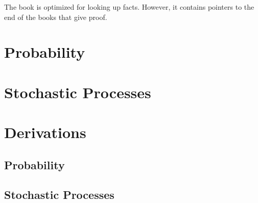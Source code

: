 \documentclass[letterpaper,12pt]{article}
\begin{document}
\raggedright

\setlength{\columnseprule}{0.5pt}
\setcounter{tocdepth}{4}
\tableofcontents

The book is optimized for looking up facts. However, it contains pointers to the
end of the books that give proof.

\section{Probability}

\section{Stochastic Processes}


\section{Derivations}
\subsection{Probability}

\subsection{Stochastic Processes}

\end{document}

